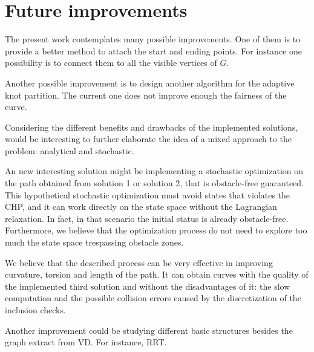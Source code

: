\documentclass[dissertation.tex]{subfiles}
\begin{document}
\section{Future improvements}
The present work contemplates many possible improvements. One of them
is to provide a better method to attach the start and ending
points. For instance one possibility is to connect them to all the
visible vertices of $G$.

Another possible improvement is to design another algorithm for the
adaptive knot partition. The current one does not improve enough the
fairness of the curve.

Considering the different benefits and drawbacks of the implemented
solutions, would be interesting to further elaborate the idea of a
mixed approach to the 
problem: analytical and stochastic.

An new interesting solution might be implementing a
stochastic optimization on the path obtained from solution 1 or
solution 2, that is obstacle-free guaranteed. This hypothetical stochastic
optimization must avoid states that violates the \acf{CHP}, and it can
work directly on the state space without the Lagrangian
relaxation. In fact, in that scenario the initial status is already
obstacle-free. Furthermore, we believe that the optimization process do
not need to explore too much the state space trespassing obstacle
zones.

We believe that the described process can be very effective in
improving curvature, torsion and length of the path. It can obtain
curves with the quality of the implemented third solution and without the
disadvantages of it: the slow computation and the possible collision
errors caused by the discretization of the inclusion checks.

Another improvement could be studying different basic structures
besides the graph extract from \acf{VD}. For instance, \acf{RRT}.
\end{document}

